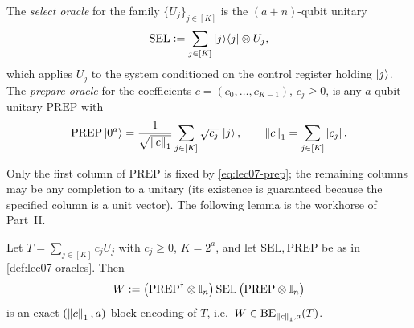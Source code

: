 \begin{definition}
\label{def:lec07-oracles}
The \emph{select oracle} for the family $\{U_j\}_{j\in[K]}$ is the $(a+n)$-qubit
unitary
\begin{equation}
  \mathrm{SEL}\vcentcolon=\sum_{j\in[K]}\ket{j}\!\bra{j}\otimes U_j,
  \label{eq:lec07-sel}
\end{equation}
which applies $U_j$ to the system conditioned on the control register holding
$\ket{j}$. The \emph{prepare oracle} for the coefficients $c=(c_0,\dots,c_{K-1})$,
$c_j\ge0$, is any $a$-qubit unitary $\mathrm{PREP}$ with
\begin{equation}
  \mathrm{PREP}\ket{0^a}=\frac{1}{\sqrt{\left\lVert c \right\rVert_1}}\sum_{j\in[K]}\sqrt{c_j}\,\ket{j},
  \qquad \left\lVert c \right\rVert_1=\sum_{j\in[K]}\left\lvert c_j \right\rvert.
  \label{eq:lec07-prep}
\end{equation}
\end{definition}

Only the first column of $\mathrm{PREP}$ is fixed by \eqref{eq:lec07-prep}; the
remaining columns may be any completion to a unitary (its existence is guaranteed
because the specified column is a unit vector). The following lemma is the
workhorse of Part~II.

\begin{theorem}
\label{thm:lec07-lcu}
Let $T=\sum_{j\in[K]}c_j U_j$ with $c_j\ge0$, $K=2^a$, and let
$\mathrm{SEL},\mathrm{PREP}$ be as in \cref{def:lec07-oracles}. Then
\begin{equation}
  W\vcentcolon=\bigl(\mathrm{PREP}^{\dagger}\otimes\mathbb{I}_n\bigr)\,\mathrm{SEL}\,
          \bigl(\mathrm{PREP}\otimes\mathbb{I}_n\bigr)
  \label{eq:lec07-W}
\end{equation}
is an exact $(\left\lVert c \right\rVert_1,a)$-block-encoding of $T$, i.e.\
$W\in\mathrm{BE}_{\left\lVert c \right\rVert_1,a}(T)$.
\end{theorem}

